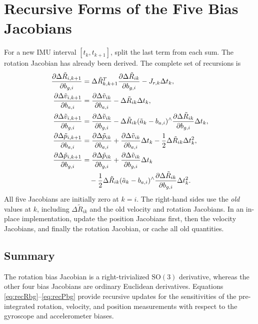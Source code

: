 \documentclass[11pt,a4paper]{article}
\newcommand{\SO}{\mathrm{SO}}
\begin{document}
\section{Recursive Forms of the Five Bias Jacobians}
For a new IMU interval $[t_k,t_{k+1}]$, split the last term
from each sum. The rotation Jacobian has already been derived.
The complete set of recursions is
\begin{align}
\frac{\partial\Delta\tilde R_{i,k+1}}{\partial b_{g,i}}
&=\Delta\tilde R_{k,k+1}^{T}\frac{\partial\Delta\tilde R_{ik}}{\partial b_{g,i}}
-J_{r,k}\Delta t_k,\label{eq:recRbg}\\
\frac{\partial\Delta\tilde v_{i,k+1}}{\partial b_{a,i}}
&=\frac{\partial\Delta\tilde v_{ik}}{\partial b_{a,i}}-\Delta\tilde R_{ik}\Delta t_k,
\label{eq:recVba}\\
\frac{\partial\Delta\tilde v_{i,k+1}}{\partial b_{g,i}}
&=\frac{\partial\Delta\tilde v_{ik}}{\partial b_{g,i}}
-\Delta\tilde R_{ik}(\tilde a_k-b_{a,i})^\wedge
\frac{\partial\Delta\tilde R_{ik}}{\partial b_{g,i}}\Delta t_k,\label{eq:recVbg}\\
\frac{\partial\Delta\tilde p_{i,k+1}}{\partial b_{a,i}}
&=\frac{\partial\Delta\tilde p_{ik}}{\partial b_{a,i}}+\frac{\partial\Delta\tilde v_{ik}}{\partial b_{a,i}}\Delta t_k
-\frac12\Delta\tilde R_{ik}\Delta t_k^2,
\label{eq:recPba}\\
\frac{\partial\Delta\tilde p_{i,k+1}}{\partial b_{g,i}}
&=\frac{\partial\Delta\tilde p_{ik}}{\partial b_{g,i}}+\frac{\partial\Delta\tilde v_{ik}}{\partial b_{g,i}}\Delta t_k\notag\\
&\quad-\frac12\Delta\tilde R_{ik}
(\tilde a_k-b_{a,i})^\wedge
\frac{\partial\Delta\tilde R_{ik}}{\partial b_{g,i}}\Delta t_k^2.
\label{eq:recPbg}
\end{align}
All five Jacobians are initially zero at $k=i$.
The right-hand sides use the \emph{old} values at $k$,
including $\Delta\tilde R_{ik}$ and the old velocity and rotation
Jacobians. In an in-place implementation, update the position
Jacobians first, then the velocity Jacobians, and finally the
rotation Jacobian, or cache all old quantities.

\subsection{Summary}
The rotation bias Jacobian is a right-trivialized $\SO(3)$
derivative, whereas the other four bias Jacobians are ordinary
Euclidean derivatives. Equations \eqref{eq:recRbg}--\eqref{eq:recPbg}
provide recursive updates for the sensitivities of the pre-integrated
rotation, velocity, and position measurements with respect to the
gyroscope and accelerometer biases.
\end{document}
